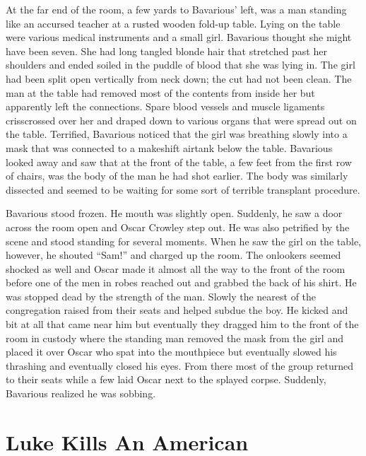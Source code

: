 At the far end of the room, a few yards to Bavarious' left,
was a man standing like an accursed teacher at a rusted wooden
fold-up table. Lying on the table were various medical instruments
and a small girl. Bavarious thought she might have been seven. She
had long tangled blonde hair that stretched past her shoulders and
ended soiled in the puddle of blood that she was lying in. The girl
had been split open vertically from neck down; the cut had not been
clean. The man at the table had removed most of the contents from
inside her but apparently left the connections. Spare blood vessels
and muscle ligaments crisscrossed over her and draped down to
various organs that were spread out on the table. Terrified,
Bavarious noticed that the girl was breathing slowly into a mask
that was connected to a makeshift airtank below the table.
Bavarious looked away and saw that at the front of the table, a few
feet from the first row of chairs, was the body of the man he had
shot earlier. The body was similarly dissected and seemed to be
waiting for some sort of terrible transplant procedure.



Bavarious stood frozen. He mouth was slightly open. Suddenly, he
saw a door across the room open and Oscar Crowley step out. He was
also petrified by the scene and stood standing for several moments.
When he saw the girl on the table, however, he shouted
``Sam!'' and charged up the room. The onlookers seemed
shocked as well and Oscar made it almost all the way to the front
of the room before one of the men in robes reached out and grabbed
the back of his shirt. He was stopped dead by the strength of the
man. Slowly the nearest of the congregation raised from their seats
and helped subdue the boy. He kicked and bit at all that came near
him but eventually they dragged him to the front of the room in
custody where the standing man removed the mask from the girl and
placed it over Oscar who spat into the mouthpiece but eventually
slowed his thrashing and eventually closed his eyes. From there
most of the group returned to their seats while a few laid Oscar
next to the splayed corpse. Suddenly, Bavarious realized he was
sobbing. 
 





\chapter{Luke Kills An American}

